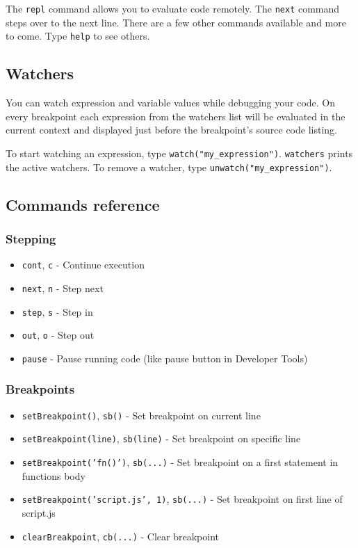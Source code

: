 The \texttt{repl} command allows you to evaluate code remotely. The
\texttt{next} command steps over to the next line. There are a few other
commands available and more to come. Type \texttt{help} to see others.

\subsection{Watchers}

You can watch expression and variable values while debugging your code.
On every breakpoint each expression from the watchers list will be
evaluated in the current context and displayed just before the
breakpoint's source code listing.

To start watching an expression, type \texttt{watch("my\_expression")}.
\texttt{watchers} prints the active watchers. To remove a watcher, type
\texttt{unwatch("my\_expression")}.

\subsection{Commands reference}

\subsubsection{Stepping}

\begin{itemize}
\item
  \texttt{cont}, \texttt{c} - Continue execution
\item
  \texttt{next}, \texttt{n} - Step next
\item
  \texttt{step}, \texttt{s} - Step in
\item
  \texttt{out}, \texttt{o} - Step out
\item
  \texttt{pause} - Pause running code (like pause button in Developer
  Tools)
\end{itemize}

\subsubsection{Breakpoints}

\begin{itemize}
\item
  \texttt{setBreakpoint()}, \texttt{sb()} - Set breakpoint on current
  line
\item
  \texttt{setBreakpoint(line)}, \texttt{sb(line)} - Set breakpoint on
  specific line
\item
  \texttt{setBreakpoint('fn()')}, \texttt{sb(...)} - Set breakpoint on a
  first statement in functions body
\item
  \texttt{setBreakpoint('script.js', 1)}, \texttt{sb(...)} - Set
  breakpoint on first line of script.js
\item
  \texttt{clearBreakpoint}, \texttt{cb(...)} - Clear breakpoint
\end{itemize}

